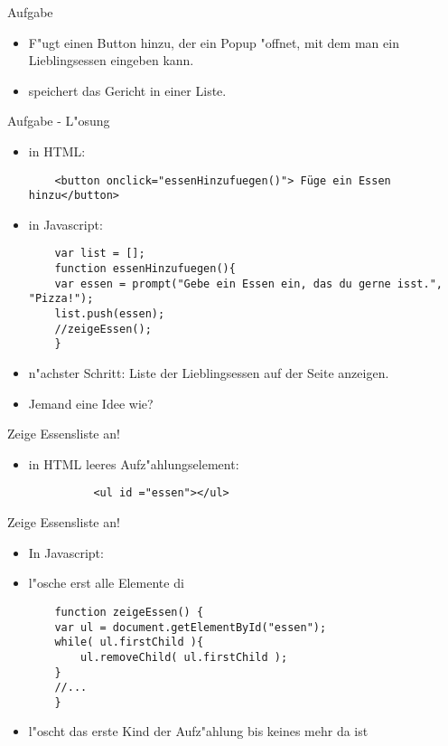 \documentclass[18pt]{beamer}
\begin{document}
\begin{frame}[fragile]{Aufgabe}
\begin{itemize}
	\item F"ugt einen Button hinzu, der ein Popup "offnet, mit dem man ein Lieblingsessen eingeben kann.
	\item speichert das Gericht in einer Liste.
\end{itemize}
\end{frame}

\begin{frame}[fragile]{Aufgabe - L"osung}
\begin{itemize}
 	\item in HTML:
 	\begin{lstlisting}
    <button onclick="essenHinzufuegen()"> Füge ein Essen hinzu</button>
 	\end{lstlisting}
 	\item in Javascript:
 	\begin{lstlisting}
 	var list = [];
 	function essenHinzufuegen(){
 	var essen = prompt("Gebe ein Essen ein, das du gerne isst.", "Pizza!");
 	list.push(essen);
 	//zeigeEssen();
 	}
 	\end{lstlisting}
 	\item n"achster Schritt: Liste der Lieblingsessen auf der Seite anzeigen. 
 	\item Jemand eine Idee wie?
\end{itemize}
\end{frame}

\begin{frame}[fragile]{Zeige Essensliste an!}
\begin{itemize}
	\item in HTML leeres Aufz"ahlungselement:
	\begin{lstlisting}
		  <ul id ="essen"></ul>
	\end{lstlisting}
\end{itemize}
\end{frame}
\begin{frame}[fragile]{Zeige Essensliste an!}
\begin{itemize}
	\item In Javascript: 
	\item l"osche erst alle Elemente di
	\begin{lstlisting}
	function zeigeEssen() {
	var ul = document.getElementById("essen");
	while( ul.firstChild ){
		ul.removeChild( ul.firstChild );
	}
	//...
	}
	\end{lstlisting}
	\item l"oscht das erste Kind der Aufz"ahlung bis keines mehr da ist
\end{itemize}
\end{frame}
\end{document}
